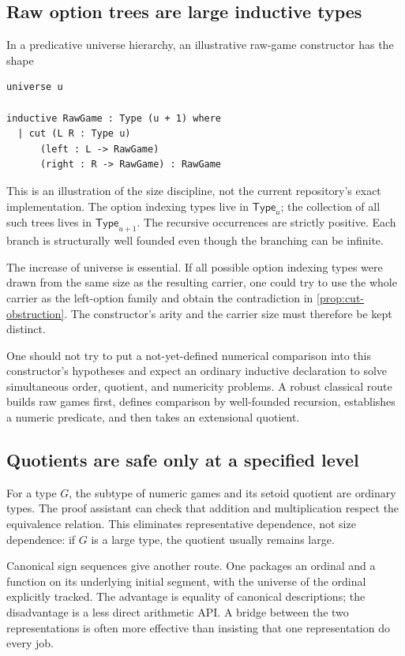 \documentclass[11pt,letterpaper]{article}
\theoremstyle{definition}
\theoremstyle{remark}
\newcommand{\Type}{\mathsf{Type}}
\numberwithin{equation}{section}
\begin{document}
\subsection{Raw option trees are large inductive types}
In a predicative universe hierarchy, an illustrative raw-game constructor has the shape
\begin{lstlisting}
universe u

inductive RawGame : Type (u + 1) where
  | cut (L R : Type u)
      (left : L -> RawGame)
      (right : R -> RawGame) : RawGame
\end{lstlisting}
This is an illustration of the size discipline, not the current repository's exact implementation. The option indexing types live in \(\Type_u\); the collection of all such trees lives in \(\Type_{u+1}\). The recursive occurrences are strictly positive. Each branch is structurally well founded even though the branching can be infinite.

The increase of universe is essential. If all possible option indexing types were drawn from the same size as the resulting carrier, one could try to use the whole carrier as the left-option family and obtain the contradiction in \cref{prop:cut-obstruction}. The constructor's arity and the carrier size must therefore be kept distinct.

One should not try to put a not-yet-defined numerical comparison into this constructor's hypotheses and expect an ordinary inductive declaration to solve simultaneous order, quotient, and numericity problems. A robust classical route builds raw games first, defines comparison by well-founded recursion, establishes a numeric predicate, and then takes an extensional quotient.

\subsection{Quotients are safe only at a specified level}
For a type \(G\), the subtype of numeric games and its setoid quotient are ordinary types. The proof assistant can check that addition and multiplication respect the equivalence relation. This eliminates representative dependence, not size dependence: if \(G\) is a large type, the quotient usually remains large.

Canonical sign sequences give another route. One packages an ordinal and a function on its underlying initial segment, with the universe of the ordinal explicitly tracked. The advantage is equality of canonical descriptions; the disadvantage is a less direct arithmetic API. A bridge between the two representations is often more effective than insisting that one representation do every job.
\end{document}
